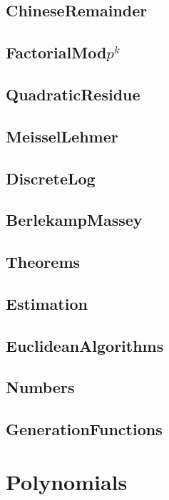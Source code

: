 	\subsection{ChineseRemainder}
	
	\subsection{FactorialMod$p^k$}
	
	\subsection{QuadraticResidue}
	
	\subsection{MeisselLehmer}
	
	\subsection{DiscreteLog}
	
	\subsection{BerlekampMassey}
	
	\subsection{Theorems}
	
	\subsection{Estimation}
	
	\subsection{EuclideanAlgorithms}
	
	\subsection{Numbers}
	
	\subsection{GenerationFunctions}
	
\section{Polynomials}
